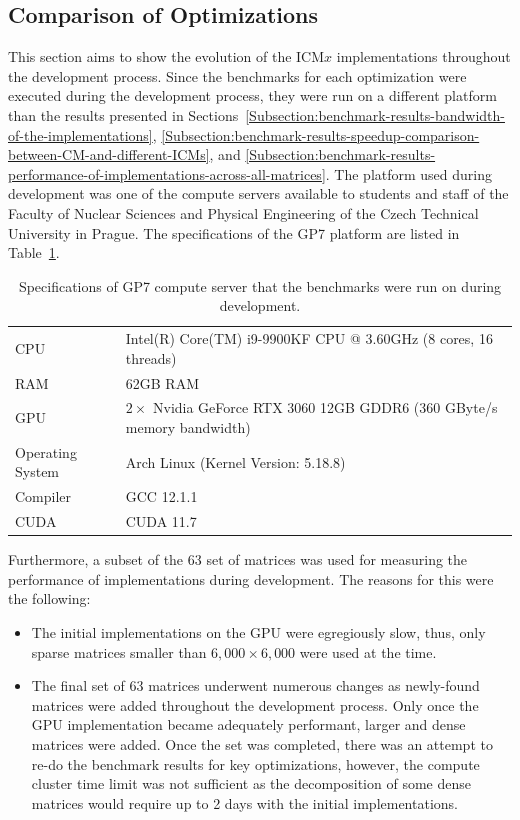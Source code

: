 \subsection{Comparison of Optimizations \TO}
This section aims to show the evolution of the ICM$ x $ implementations throughout the development process. Since the benchmarks for each optimization were executed during the development process, they were run on a different platform than the results presented in Sections~\ref{Subsection:benchmark-results-bandwidth-of-the-implementations}, \ref{Subsection:benchmark-results-speedup-comparison-between-CM-and-different-ICMs}, and \ref{Subsection:benchmark-results-performance-of-implementations-across-all-matrices}. The platform used during development was one of the compute servers available to students and staff of the Faculty of Nuclear Sciences and Physical Engineering of the Czech Technical University in Prague. The specifications of the GP7 platform are listed in Table~\ref{Table:benchmark-results-comparison-of-optimizations}.

\begin{table}[h!]
	\centering
	\begin{tabular}{|l|l|}
		\hline
		CPU              & Intel(R) Core(TM) i9-9900KF CPU @ 3.60GHz (8 cores, 16 threads) \\
		RAM              & 62GB RAM \\
		GPU              & $ 2\times $ Nvidia GeForce RTX 3060 12GB GDDR6 (360 GByte/s memory bandwidth) \\
		Operating System & Arch Linux (Kernel Version: 5.18.8) \\
		Compiler         & GCC 12.1.1 \\
		CUDA             & CUDA 11.7 \\ \hline
	\end{tabular}
	\caption{Specifications of GP7 compute server that the benchmarks were run on during development.}
	\label{Table:benchmark-results-comparison-of-optimizations}
\end{table}

Furthermore, a subset of the $ 63 $ set of matrices was used for measuring the performance of implementations during development. The reasons for this were the following:

\begin{itemize}
	\item The initial implementations on the GPU were egregiously slow, thus, only sparse matrices smaller than $ 6,000\times 6,000 $ were used at the time.
	\item The final set of $ 63 $ matrices underwent numerous changes as newly-found matrices were added throughout the development process. Only once the GPU implementation became adequately performant, larger and dense matrices were added. Once the set was completed, there was an attempt to re-do the benchmark results for key optimizations, however, the compute cluster time limit was not sufficient as the decomposition of some dense matrices would require up to 2 days with the initial implementations.
\end{itemize}

